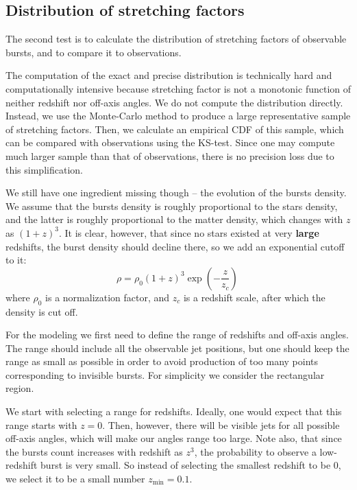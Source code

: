 \documentclass[manuscript]{aastex}
\begin{document}
\subsection{Distribution of stretching factors}
\label{sec:distribution}

The second test is to calculate the distribution of stretching factors
of observable bursts, and to compare it to observations.

The computation of the exact and precise distribution is technically
hard and computationally intensive because stretching factor is not a
monotonic function of neither redshift nor off-axis angles.  We do not
compute the distribution directly. Instead, we use the Monte-Carlo
method to produce a large representative sample of stretching
factors. Then, we calculate an empirical CDF of this sample, which can
be compared with observations using the KS-test. Since one may compute
much larger sample than that of observations, there is no precision
loss due to this simplification.

We still have one ingredient missing though -- the evolution of the
bursts density. We assume that the bursts density is roughly
proportional to the stars density, and the latter is roughly
proportional to the matter density, which changes with $z$ as
$\left(1+z\right)^3$. It is clear, however, that since no stars
existed at very {\bf large} redshifts, the burst density should decline
there, so we add an exponential cutoff to it:
\begin{equation}\label{eq:redshift}
\rho = \rho_0 \left(1+z\right)^3 \exp\left(-\frac{z}{z_c}\right)\,
\end{equation}
where $\rho_0$ is a normalization factor, and $z_c$ is a redshift
scale, after which the density is cut off.

For the modeling we first need to define the range of redshifts and
off-axis angles. The range should include all the observable jet
positions, but one should keep the range as small as possible in order
to avoid production of too many points corresponding to invisible
bursts. For simplicity we consider the rectangular region.

We start with selecting a range for redshifts. Ideally, one would
expect that this range starts with $z=0$. Then, however, there will be
visible jets for all possible off-axis angles, which will make our
angles range too large. Note also, that since the bursts count
increases with redshift as $z^3$, the probability to observe a
low-redshift burst is very small. So instead of selecting the smallest
redshift to be $0$, we select it to be a small number $z_\text{min} = 0.1$.
\end{document}
